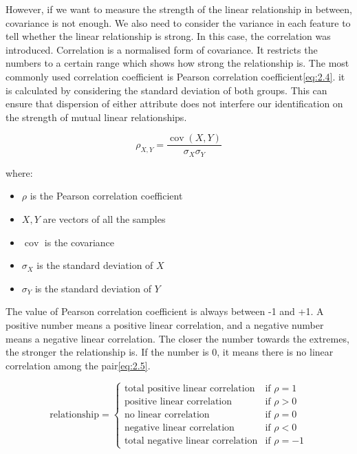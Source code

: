 \documentclass[11pt]{article} %
\theoremstyle{plain}
\theoremstyle{definition}
\begin{document}
However, if we want to measure the strength of the linear relationship in between, covariance is not enough. We also need to consider the variance in each feature to tell whether the linear relationship is strong. In this case, the correlation was introduced. Correlation is a normalised form of covariance. It restricts the numbers to a certain range which shows how strong the relationship is. The most commonly used correlation coefficient is Pearson correlation coefficient\eqref{eq:2.4}. it is calculated by considering the standard deviation of both groups. This can ensure that dispersion of either attribute does not interfere our identification on the strength of mutual linear relationships\cite{ghall/pcc:2015}.

{
  \begin{equation}
    \label{eq:2.4}
    \tag{2.4}
    \rho _{X,Y}={\frac {\operatorname {cov} (X,Y)}{\sigma _{X}\sigma _{Y}}}
  \end{equation}

  \footnotesize
  where:
  \begin{itemize}[label=-, leftmargin=4em, itemsep=0.1em]
    \item ${\rho}$ is the Pearson correlation coefficient
    \item ${X, Y}$ are vectors of all the samples
    \item $\operatorname {cov}$ is the covariance
    \item ${\sigma}_{X}$ is the standard deviation of ${X}$
    \item ${\sigma}_{Y}$ is the standard deviation of ${Y}$
  \end{itemize}
}

The value of Pearson correlation coefficient is always between -1 and +1. A positive number means a positive linear correlation, and a negative number means a negative linear correlation. The closer the number towards the extremes, the stronger the relationship is. If the number is 0, it means there is no linear correlation among the pair\eqref{eq:2.5}.

\begin{equation}
  \label{eq:2.5}
  \tag{2.5}
  \text{relationship} =
  \begin{cases}
    \text{total positive linear correlation} & \text{if } \rho = 1 \\
    \text{positive linear correlation} & \text{if } \rho > 0 \\
    \text{no linear correlation} & \text{if } \rho = 0 \\
    \text{negative linear correlation} & \text{if } \rho < 0 \\
    \text{total negative linear correlation} & \text{if } \rho = -1
  \end{cases}
\end{equation}
\end{document}
